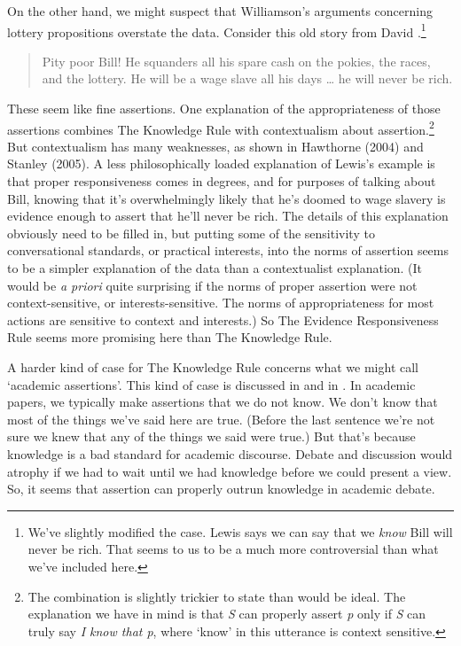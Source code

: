 On the other hand, we might suspect that Williamson's arguments concerning lottery propositions overstate the data. Consider this old story from David \citet{Lewis1996b}.\footnote{We've slightly modified the case. Lewis says we can say that we \textit{know} Bill will never be rich. That seems to us to be a much more controversial than what we've included here.}

\begin{quote}
Pity poor Bill! He squanders all his spare cash on the pokies, the races, and the lottery. He will be a wage slave all his days {\dots} he will never be rich. \cite[443 in reprint]{Lewis1996b}
\end{quote}

\noindent These seem like fine assertions. One explanation of the appropriateness of those assertions combines The Knowledge Rule with contextualism about assertion.\footnote{The combination is slightly trickier to state than would be ideal. The explanation we have in mind is that \textit{S} can properly assert \textit{p} only if \textit{S} can truly say \textit{I know that p}, where `know' in this utterance is context sensitive.} But contextualism has many weaknesses, as shown in Hawthorne (2004) and Stanley (2005). A less philosophically loaded explanation of Lewis's example is that proper responsiveness comes in degrees, and for purposes of talking about Bill, knowing that it's overwhelmingly likely that he's doomed to wage slavery is evidence enough to assert that he'll never be rich. The details of this explanation obviously need to be filled in, but putting some of the sensitivity to conversational standards, or practical interests, into the norms of assertion seems to be a simpler explanation of the data than a contextualist explanation. (It would be \textit{a priori} quite surprising if the norms of proper assertion were not context-sensitive, or interests-sensitive. The norms of appropriateness for most actions are sensitive to context and interests.) So The Evidence Responsiveness Rule seems more promising here than The Knowledge Rule.

A harder kind of case for The Knowledge Rule concerns what we might call `academic assertions'. This kind of case is discussed in \citet{Douven2006} and in \citet{MaitraANG}. In academic papers, we typically make assertions that we do not know. We don't know that most of the things we've said here are true. (Before the last sentence we're not sure we knew that any of the things we said were true.) But that's because knowledge is a bad standard for academic discourse. Debate and discussion would atrophy if we had to wait until we had knowledge before we could present a view. So, it seems that assertion can properly outrun knowledge in academic debate.


